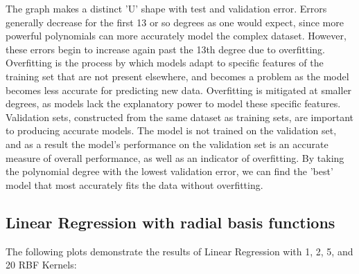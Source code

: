 \documentclass[a4paper]{article}
\begin{document}
The graph makes a distinct 'U' shape with test and validation error.  Errors generally decrease for the first 13 or so degrees as one would expect, since more powerful polynomials can more accurately model the complex dataset.  However, these errors begin to increase again past the 13th degree due to overfitting.  Overfitting is the process by which models adapt to specific features of the training set that are not present elsewhere, and becomes a problem as the model becomes less accurate for predicting new data.  Overfitting is mitigated at smaller degrees, as models lack the explanatory power to model these specific features.  Validation sets, constructed from the same dataset as training sets, are important to producing accurate models.  The model is not trained on the validation set, and as a result the model's performance on the validation set is an accurate measure of overall performance, as well as an indicator of overfitting.  By taking the polynomial degree with the lowest validation error, we can find the 'best' model that most accurately fits the data without overfitting.

\subsection{Linear Regression with radial basis functions}

The following plots demonstrate the results of Linear Regression with 1, 2, 5, and 20 RBF Kernels:
\end{document}
